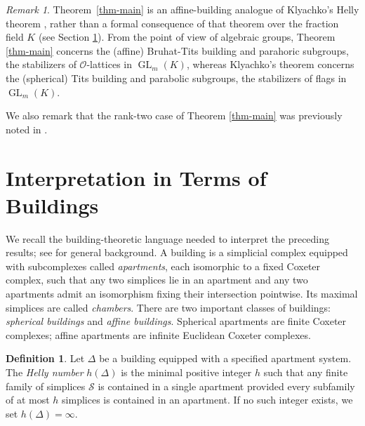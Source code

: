 \documentclass[12pt]{amsart}
\theoremstyle{definition}
\newtheorem{definition}[theorem]{Definition}
\theoremstyle{remark}
\newtheorem{rmk}[theorem]{Remark}
\begin{document}
\begin{rmk}
Theorem~\ref{thm-main} is an affine-building
analogue of Klyachko's Helly theorem \cite[Theorem~6.1.2]{Klyachko}, rather than a formal consequence of that theorem over the fraction field $K$ (see Section \ref{sec:buildings}). %
From the point of view of algebraic groups, Theorem \ref{thm-main} concerns the (affine) Bruhat-Tits building and parahoric subgroups, the stabilizers of $\mathcal O$-lattices in $\operatorname{GL}_m(K)$, whereas Klyachko's theorem concerns the (spherical) Tits building and  parabolic subgroups, the stabilizers of flags in $\operatorname{GL}_m(K)$.

We also remark that the rank-two case of Theorem \ref{thm-main} was previously noted in \cite[Example~5.4]{KMT}. %
\end{rmk}





\section{Interpretation in Terms of Buildings}
\label{sec:buildings}

We recall the building-theoretic language needed to interpret the
preceding results; see \cite{AB} for general background. A
building is a simplicial complex equipped with subcomplexes called
\emph{apartments}, each isomorphic to a fixed Coxeter complex, such
that any two simplices lie in an apartment and any two apartments
admit an isomorphism fixing their intersection pointwise.
Its maximal simplices are called \emph{chambers}. There are two important classes of buildings: \emph{spherical buildings} and \emph{affine buildings}. 
Spherical apartments are finite Coxeter complexes; affine apartments
are infinite Euclidean Coxeter complexes.

\begin{definition}
\label{defn:apartment-helly}
Let $\Delta$ be a building equipped with a specified apartment system. The \emph{Helly number} $h(\Delta)$ is the minimal positive integer $h$ such that any finite family of simplices $\mathcal{S}$ is contained in a single apartment provided every subfamily of at most $h$ simplices is contained in an apartment. If no such integer exists, we set $h(\Delta) = \infty$. %
\end{definition}
\end{document}
